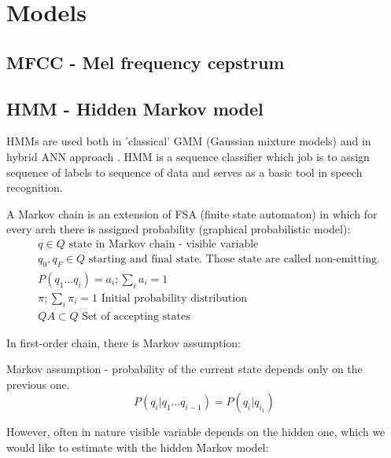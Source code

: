 \chapter{Models}


\section{MFCC - Mel frequency cepstrum}





\section{HMM - Hidden Markov model}

HMMs are used both in 'classical' GMM (Gaussian mixture models) and in hybrid ANN approach \parencite{jurafsky}. HMM is a sequence classifier which job is to assign sequence of labels to sequence of data and serves as a basic tool in speech recognition.

\begin{definition} A Markov chain is an extension of FSA (finite state automaton) in which for every arch there is assigned probability (graphical probabilistic model):
	\begin{align}
		& q \in Q \text{ state in Markov chain - visible variable} \\
		& q_0,q_F \in Q \text{ starting and final state. Those state are called non-emitting.} \\
		& P(q_1 \ldots q_{i})=a_i; \sum\limits_{i}a_i=1\\
		& \pi; \sum\limits_{i} \pi_i=1 \text{ Initial probability distribution} \\
		& QA \subset Q \text{ Set of accepting states } 
	\end{align}
\end{definition}

In first-order chain, there is Markov assumption:
\begin{definition} Markov assumption - probability of the current state depends only on the previous one.
	\begin{equation}
		P(q_i|q_1\ldots q_{i-1})=P(q_i|q_{i_1})
	\end{equation}
\end{definition}
However, often in nature visible variable depends on the hidden one, which we would like to estimate with the hidden Markov model:

